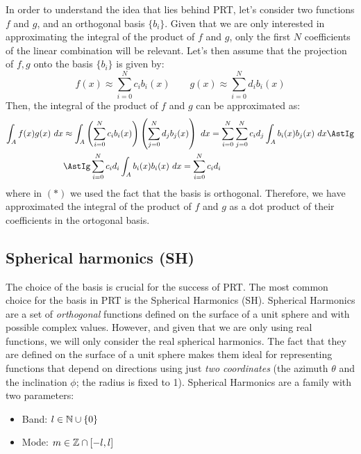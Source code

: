 In order to understand the idea that lies behind PRT, let's consider two functions $f$ and $g$, and an orthogonal basis $\{b_i\}$. Given that we are only interested in approximating the integral of the product of $f$ and $g$, only the first $N$ coefficients of the linear combination will be relevant. Let's then assume that the projection of $f,g$ onto the basis $\{b_i\}$ is given by:
\begin{equation*}
    f(x) \approx \sum_{i=0}^{N} c_i b_i(x) \qquad g(x) \approx \sum_{i=0}^{N} d_i b_i(x)
\end{equation*}
Then, the integral of the product of $f$ and $g$ can be approximated as:
\begin{align*}
    \int_{A} f(x) g(x) \ dx &\approx \int_{A} \left( \sum_{i=0}^{N} c_i b_i(x) \right) \left( \sum_{j=0}^{N} d_j b_j(x) \right) \ dx = \sum_{i=0}^{N}
    \sum_{j=0}^{N} c_i d_j \int_{A} b_i(x) b_j(x) \ dx
    \AstIg\\&\AstIg \sum_{i=0}^{N} c_i d_i\int_{A} b_i(x) b_i(x) \ dx = \sum_{i=0}^{N} c_i d_i
\end{align*}
where in $(\ast)$ we used the fact that the basis is orthogonal. Therefore, we have approximated the integral of the product of $f$ and $g$ as a dot product of their coefficients in the ortogonal basis.

\subsection{Spherical harmonics (SH)}

The choice of the basis is crucial for the success of PRT. The most common choice for the basis in PRT is the Spherical Harmonics (SH). Spherical Harmonics are a set of \emph{orthogonal} functions defined on the surface of a unit sphere and with possible complex values. However, and given that we are only using real functions, we will only consider the real spherical harmonics. The fact that they are defined on the surface of a unit sphere makes them ideal for representing functions that depend on directions using just \emph{two coordinates} (the azimuth $\theta$ and the inclination $\phi$; the radius is fixed to 1). Spherical Harmonics are a family with two parameters:
\begin{itemize}
    \item Band: $l\in \mathbb{N}\cup\{0\} $
    \item Mode: $m\in \mathbb{Z}\cap \left[-l, l\right]$
\end{itemize}

